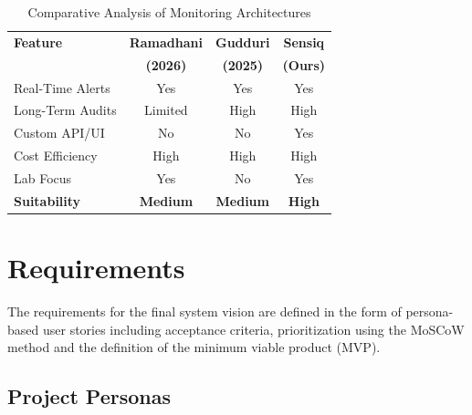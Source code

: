 \documentclass[conference,a4paper,flushend]{cs-techrep} %
\begin{document}
\begin{table}[htb]
    \centering
    \caption{Comparative Analysis of Monitoring Architectures}
    \label{tab:comparison}
    \small %
    \begin{tabularx}{\linewidth}{>{\raggedright\arraybackslash}X c c c}
        \toprule
        \textbf{Feature} & \textbf{Ramadhani} & \textbf{Gudduri} & \textbf{Sensiq} \\
        & \textbf{(2026)}    & \textbf{(2025)}  & \textbf{(Ours)} \\
        \midrule
        Real-Time Alerts & Yes & Yes & Yes \\
        Long-Term Audits & Limited & High & High \\
        Custom API/UI    & No & No & Yes \\
        Cost Efficiency  & High & High & High \\
        Lab Focus        & Yes & No & Yes \\
        \midrule
        \textbf{Suitability} & \textbf{Medium} & \textbf{Medium} & \textbf{High} \\
        \bottomrule
    \end{tabularx}
\end{table}

\section{Requirements}\label{sec:requirements}

The requirements for the final system vision are defined in the form of persona-based user stories including 
acceptance criteria, prioritization using the MoSCoW method and the definition of the minimum viable product (MVP).


\subsection{Project Personas}\label{sec:project_personas}

\end{document}
